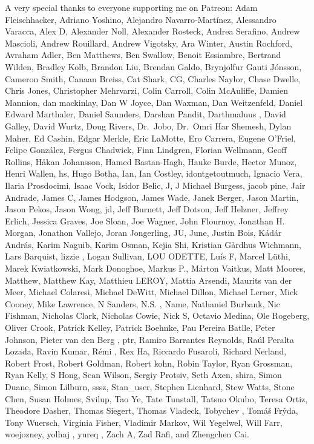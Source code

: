 \documentclass[
  letterpaper,
  DIV=11,
  numbers=noendperiod]{scrartcl}
\begin{document}
A very special thanks to everyone supporting me on Patreon: Adam
Fleischhacker, Adriano Yoshino, Alejandro Navarro-Martínez, Alessandro
Varacca, Alex D, Alexander Noll, Alexander Rosteck, Andrea Serafino,
Andrew Mascioli, Andrew Rouillard, Andrew Vigotsky, Ara Winter, Austin
Rochford, Avraham Adler, Ben Matthews, Ben Swallow, Benoit Essiambre,
Bertrand Wilden, Bradley Kolb, Brandon Liu, Brendan Galdo, Brynjolfur
Gauti Jónsson, Cameron Smith, Canaan Breiss, Cat Shark, CG, Charles
Naylor, Chase Dwelle, Chris Jones, Christopher Mehrvarzi, Colin Carroll,
Colin McAuliffe, Damien Mannion, dan mackinlay, Dan W Joyce, Dan Waxman,
Dan Weitzenfeld, Daniel Edward Marthaler, Daniel Saunders, Darshan
Pandit, Darthmaluus , David Galley, David Wurtz, Doug Rivers, Dr.~Jobo,
Dr.~Omri Har Shemesh, Dylan Maher, Ed Cashin, Edgar Merkle, Eric
LaMotte, Ero Carrera, Eugene O'Friel, Felipe González, Fergus Chadwick,
Finn Lindgren, Florian Wellmann, Geoff Rollins, Håkan Johansson, Hamed
Bastan-Hagh, Hauke Burde, Hector Munoz, Henri Wallen, hs, Hugo Botha,
Ian, Ian Costley, idontgetoutmuch, Ignacio Vera, Ilaria Prosdocimi,
Isaac Vock, Isidor Belic, J, J Michael Burgess, jacob pine, Jair
Andrade, James C, James Hodgson, James Wade, Janek Berger, Jason Martin,
Jason Pekos, Jason Wong, jd, Jeff Burnett, Jeff Dotson, Jeff Helzner,
Jeffrey Erlich, Jessica Graves, Joe Sloan, Joe Wagner, John Flournoy,
Jonathan H. Morgan, Jonathon Vallejo, Joran Jongerling, JU, June, Justin
Bois, Kádár András, Karim Naguib, Karim Osman, Kejia Shi, Kristian
Gårdhus Wichmann, Lars Barquist, lizzie , Logan Sullivan, LOU ODETTE,
Luís F, Marcel Lüthi, Marek Kwiatkowski, Mark Donoghoe, Markus P.,
Márton Vaitkus, Matt Moores, Matthew, Matthew Kay, Matthieu LEROY,
Mattia Arsendi, Maurits van der Meer, Michael Colaresi, Michael DeWitt,
Michael Dillon, Michael Lerner, Mick Cooney, Mike Lawrence, N Sanders,
N.S. , Name, Nathaniel Burbank, Nic Fishman, Nicholas Clark, Nicholas
Cowie, Nick S, Octavio Medina, Ole Rogeberg, Oliver Crook, Patrick
Kelley, Patrick Boehnke, Pau Pereira Batlle, Peter Johnson, Pieter van
den Berg , ptr, Ramiro Barrantes Reynolds, Raúl Peralta Lozada, Ravin
Kumar, Rémi , Rex Ha, Riccardo Fusaroli, Richard Nerland, Robert Frost,
Robert Goldman, Robert kohn, Robin Taylor, Ryan Grossman, Ryan Kelly, S
Hong, Sean Wilson, Sergiy Protsiv, Seth Axen, shira, Simon Duane, Simon
Lilburn, sssz, Stan\_user, Stephen Lienhard, Stew Watts, Stone Chen,
Susan Holmes, Svilup, Tao Ye, Tate Tunstall, Tatsuo Okubo, Teresa Ortiz,
Theodore Dasher, Thomas Siegert, Thomas Vladeck, Tobychev , Tomáš Frýda,
Tony Wuersch, Virginia Fisher, Vladimir Markov, Wil Yegelwel, Will Farr,
woejozney, yolhaj , yureq , Zach A, Zad Rafi, and Zhengchen Cai.
\end{document}
